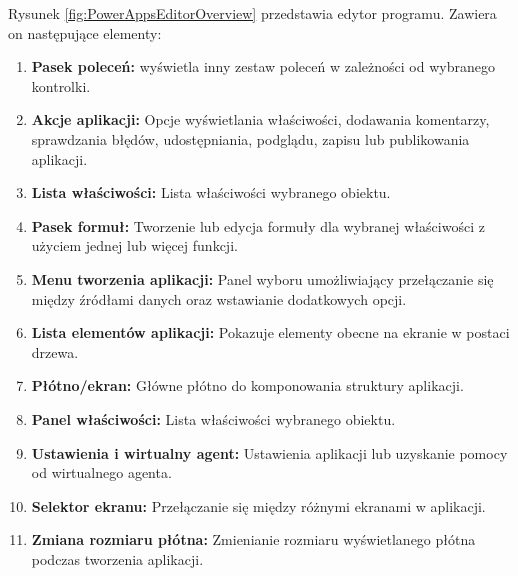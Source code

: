 Rysunek \ref{fig:PowerAppsEditorOverview} przedstawia edytor programu. Zawiera on następujące elementy:
\begin{enumerate}
    \item \textbf{Pasek poleceń:} wyświetla inny zestaw poleceń w zależności od wybranego kontrolki.
    \item \textbf{Akcje aplikacji:} Opcje wyświetlania właściwości, dodawania komentarzy, sprawdzania błędów, udostępniania, podglądu, zapisu lub publikowania aplikacji.
    \item \textbf{Lista właściwości:} Lista właściwości wybranego obiektu.
    \item \textbf{Pasek formuł:} Tworzenie lub edycja formuły dla wybranej właściwości z użyciem jednej lub więcej funkcji.
    \item \textbf{Menu tworzenia aplikacji:} Panel wyboru umożliwiający przełączanie się między źródłami danych oraz wstawianie dodatkowych opcji.
    \item \textbf{Lista elementów aplikacji:} Pokazuje elementy obecne na ekranie w postaci drzewa.
    \item \textbf{Płótno/ekran:} Główne płótno do komponowania struktury aplikacji.
    \item \textbf{Panel właściwości:} Lista właściwości wybranego obiektu.
    \item \textbf{Ustawienia i wirtualny agent:} Ustawienia aplikacji lub uzyskanie pomocy od wirtualnego agenta.
    \item \textbf{Selektor ekranu:} Przełączanie się między różnymi ekranami w aplikacji.
    \item \textbf{Zmiana rozmiaru płótna:} Zmienianie rozmiaru wyświetlanego płótna podczas tworzenia aplikacji.
\end{enumerate}
